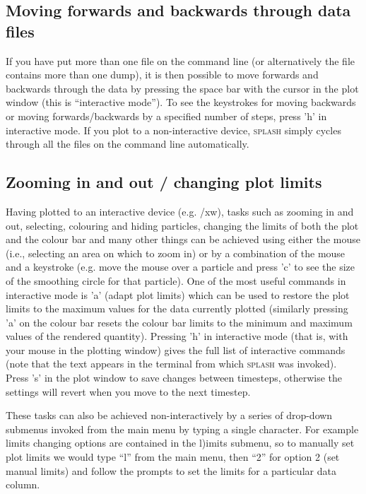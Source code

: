 \documentclass[a4paper,10pt]{article}
\newcommand{\splash}{\textsc{splash }}
\begin{document}
\subsection{Moving forwards and backwards through data files}
 If you have put more than one file on the command line (or alternatively the file contains more than one dump), it is then possible to move forwards and backwards through the data by pressing the space bar with the cursor in the plot window (this is ``interactive mode''). To see the keystrokes for moving backwards or moving forwards/backwards by a specified number of steps, press 'h' in interactive mode. If you plot to a non-interactive device, \splash simply cycles through all the files on the command line automatically.

\subsection{Zooming in and out / changing plot limits}
 Having plotted to an interactive device (e.g. /xw), tasks such as zooming in and out, selecting, colouring and hiding particles, changing the limits of both the plot and the colour bar and many other things can be achieved using either the mouse (i.e., selecting an area on which to zoom in) or by a combination of the mouse and a keystroke (e.g. move the mouse over a particle and press 'c' to see the size of the smoothing circle for that particle). One of the most useful commands in interactive mode is 'a' (adapt plot limits) which can be used to restore the plot limits to the maximum values for the data currently plotted (similarly pressing 'a' on the colour bar resets the colour bar limits to the minimum and maximum values of the rendered quantity). Pressing 'h' in interactive mode (that is, with your mouse in the plotting window) gives the full list of interactive commands (note that the text appears in the terminal from which \splash was invoked). Press 's' in the plot window to save changes between timesteps, otherwise the settings will revert when you move to the next timestep. 
 
 These tasks can also be achieved non-interactively by a series of drop-down submenus invoked from the main menu by typing a single character. For example limits changing options are contained in the l)imits submenu, so to manually set plot limits we would type ``l'' from the main menu, then ``2'' for option 2 (set manual limits) and follow the prompts to set the limits for a particular data column. 
\end{document}
